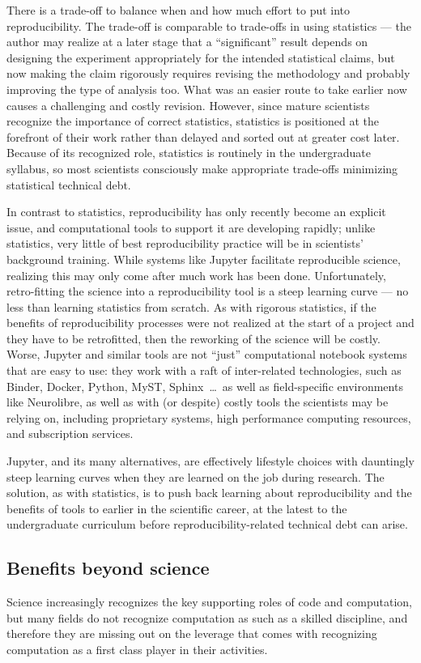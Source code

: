 \documentclass{comjnl}
\begin{document}
There is a trade-off to balance when and how much effort to put into reproducibility. The trade-off is comparable to trade-offs in using statistics --- the author may realize at a later stage that a ``significant'' result depends on designing the experiment appropriately for the intended statistical claims, but now making the claim rigorously requires revising the methodology and probably improving the type of analysis too. What was an easier route to take earlier now causes a challenging and costly revision. However, since mature scientists recognize the importance of correct statistics, statistics is positioned at the forefront of their work rather than delayed and sorted out at greater cost later. Because of its recognized role, statistics is routinely in the undergraduate syllabus, so most scientists consciously make appropriate trade-offs minimizing statistical technical debt.
 
In contrast to statistics, reproducibility has only recently become an explicit issue, and computational tools to support it are developing rapidly; unlike statistics, very little of best reproducibility practice will be in scientists' background training. While systems like Jupyter facilitate reproducible science, realizing this may only come after much work has been done. Unfortunately, retro-fitting the science into a reproducibility tool is a steep learning curve --- no less than learning statistics from scratch. As with rigorous statistics, if the benefits of reproducibility processes were not realized at the start of a project and they have to be retrofitted, then the reworking of the science will be costly. Worse, Jupyter and similar tools are not ``just'' computational notebook systems that are easy to use: they work with a raft of inter-related technologies, such as Binder, Docker, Python, MyST, Sphinx\ \ldots\ as well as field-specific environments like Neurolibre, as well as with (or despite) costly tools the scientists may be relying on, including proprietary systems, high performance computing resources, and subscription services.

Jupyter, and its many alternatives, are effectively lifestyle choices with dauntingly steep learning curves when they are learned on the job during research. The solution, as with statistics, is to push back learning about reproducibility and the benefits of tools to earlier in the scientific career, at the latest to the undergraduate curriculum before reproducibility-related technical debt can arise.

\subsection{Benefits beyond science}\label{benefits-beyond-science}
Science increasingly recognizes the key supporting roles of code and computation, but many fields do not recognize computation as such as a skilled discipline, and therefore they are missing out on the leverage that comes with recognizing computation as a first class player in their activities. 
\end{document}
